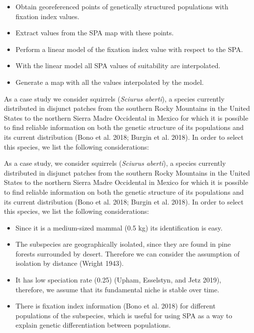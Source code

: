 \documentclass[
]{article}
\providecommand{\tightlist}{%
  \setlength{\itemsep}{0pt}\setlength{\parskip}{0pt}}
\begin{document}
\begin{itemize}
\tightlist
\item
  Obtain georeferenced points of genetically structured populations with
  fixation index values.
\item
  Extract values from the SPA map with these points.
\item
  Perform a linear model of the fixation index value with respect to the
  SPA.
\item
  With the linear model all SPA values of suitability are interpolated.
\item
  Generate a map with all the values interpolated by the model.
\end{itemize}

As a case study we consider squirrels (\emph{Sciurus aberti}), a species
currently distributed in disjunct patches from the southern Rocky
Mountains in the United States to the northern Sierra Madre Occidental
in Mexico for which it is possible to find reliable information on both
the genetic structure of its populations and its current distribution
(Bono et al. 2018; Burgin et al. 2018). In order to select this species,
we list the following considerations:

As a case study, we consider squirrels (\emph{Sciurus aberti}), a
species currently distributed in disjunct patches from the southern
Rocky Mountains in the United States to the northern Sierra Madre
Occidental in Mexico for which it is possible to find reliable
information on both the genetic structure of its populations and its
current distribution (Bono et al. 2018; Burgin et al. 2018). In order to
select this species, we list the following considerations:

\begin{itemize}
\tightlist
\item
  Since it is a medium-sized mammal (0.5 kg) its identification is easy.
\item
  The subspecies are geographically isolated, since they are found in
  pine forests surrounded by desert. Therefore we can consider the
  assumption of isolation by distance (Wright 1943).
\item
  It has low speciation rate (0.25) (Upham, Esselstyn, and Jetz 2019),
  therefore, we assume that its fundamental niche is stable over time.
\item
  There is fixation index information (Bono et al. 2018) for different
  populations of the subspecies, which is useful for using SPA as a way
  to explain genetic differentiation between populations.
\end{itemize}
\end{document}
